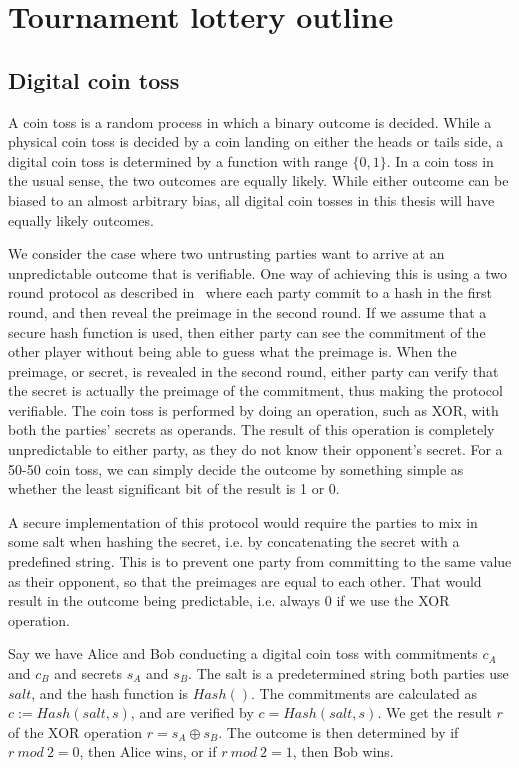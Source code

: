 \section{Tournament lottery outline}
\label{sec:outline}

\subsection{Digital coin toss}

A coin toss is a random process in which a binary outcome is decided. While a physical coin toss is decided by a coin landing on either the heads or tails side, a digital coin toss is determined by a function with range $\{0, 1\}$. In a coin toss in the usual sense, the two outcomes are equally likely. While either outcome can be biased to an almost arbitrary bias, all digital coin tosses in this thesis will have equally likely outcomes.

We consider the case where two untrusting parties want to arrive at an unpredictable outcome that is verifiable. One way of achieving this is using a two round protocol as described in~\cite{blum1983coin} where each party commit to a hash in the first round, and then reveal the preimage in the second round. If we assume that a secure hash function is used, then either party can see the commitment of the other player without being able to guess what the preimage is. When the preimage, or secret, is revealed in the second round, either party can verify that the secret is actually the preimage of the commitment, thus making the protocol verifiable. The coin toss is performed by doing an operation, such as XOR, with both the parties' secrets as operands. The result of this operation is completely unpredictable to either party, as they do not know their opponent's secret. For a 50-50 coin toss, we can simply decide the outcome by something simple as whether the least significant bit of the result is 1 or 0.

A secure implementation of this protocol would require the parties to mix in some salt when hashing the secret, i.e. by concatenating the secret with a predefined string. This is to prevent one party from committing to the same value as their opponent, so that the preimages are equal to each other. That would result in the outcome being predictable, i.e. always $0$ if we use the XOR operation. 

Say we have Alice and Bob conducting a digital coin toss with commitments $c_A$ and $c_B$ and secrets $s_A$ and $s_B$. The salt is a predetermined string both parties use $salt$, and the hash function is $Hash()$. The commitments are calculated as $c:=Hash(salt, s)$, and are verified by $c=Hash(salt, s)$. We get the result $r$ of the XOR operation $r=s_A \oplus s_B$. The outcome is then determined by if $r\ mod\ 2 = 0$, then Alice wins, or if $r\ mod\ 2 = 1$, then Bob wins.


